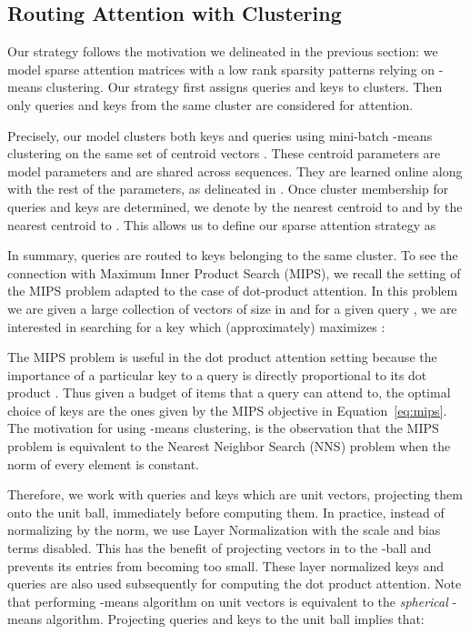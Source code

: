 \documentclass[a4paper]{article}
\begin{document}
\subsection{Routing Attention with Clustering}\label{sec:routing}
Our strategy follows the motivation we delineated in the previous section:
we model sparse attention matrices with a low rank sparsity patterns relying 
on -means clustering. Our strategy first assigns queries and keys to clusters.
Then only queries and keys from the same cluster are considered for attention.

Precisely, our model clusters both keys  and queries  
using mini-batch -means clustering on the same
set of centroid vectors 
. These
centroid parameters are model parameters and are shared across 
sequences. They are learned online along with the rest of the parameters, as 
delineated in \cite{bottou1995convergence}. 
Once cluster membership for queries and keys are determined, we
denote by  the nearest centroid to  and
by  the nearest centroid to .
This allows us to define our sparse attention strategy as

In summary, queries are routed to keys belonging to the same cluster.
To see the connection with Maximum Inner Product Search (MIPS), we recall
the setting of the MIPS problem adapted to the case of dot-product attention. 
In this problem we are given a large collection of vectors 
 of size  in 
and for a given query ,
we are interested in searching for a key  which (approximately)
maximizes :

The MIPS problem is useful in the dot product attention setting because the importance
of a particular key  to a query  is directly proportional to its
dot product . Thus given a budget of items that a query
 can attend to, the optimal choice of keys  are the ones given by
the MIPS objective in Equation~\ref{eq:mips}. 
The motivation for using -means clustering, is the
observation that the MIPS problem is equivalent to the Nearest Neighbor
Search (NNS) problem when the norm of every element  is
constant. 

Therefore, we work with queries and keys 
which are unit vectors, projecting them onto the
unit ball, immediately before computing them.
In practice, instead of normalizing by the  norm, we 
use Layer Normalization \citep{layernorm2016} with the scale and bias
terms disabled. This has the benefit of projecting vectors in  to the 
-ball and prevents its entries from becoming too small. 
These layer normalized keys and queries are also
used subsequently for computing the dot product attention.
Note that performing -means algorithm on unit vectors 
is equivalent to the \emph{spherical} -means algorithm. 
Projecting queries and keys to the unit ball implies that:
\end{document}
